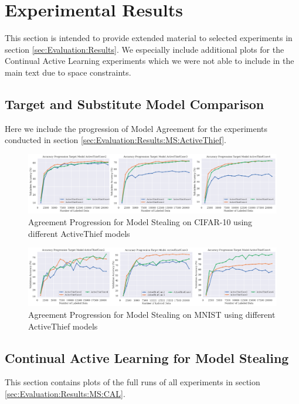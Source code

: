 \section{Experimental Results}
\label{sec:Appendix:Results}
This section is intended to provide extended material to selected experiments in section \ref{sec:Evaluation:Results}. We especially
include additional plots for the Continual Active Learning experiments which we were not able to include in the main text due to
space constraints.

\subsection{Target and Substitute Model Comparison}
\label{sec:Appendix:TargetSubstituteComparison}
Here we include the progression of Model Agreement for the experiments conducted in section \ref{sec:Evaluation:Results:MS:ActiveThief}.

\begin{figure}[!htb]
    \centering
    \includegraphics[width=\linewidth]{images/results_CALMS/cifar10_model_comp.png}
    \caption{Agreement Progression for Model Stealing on CIFAR-10 using different ActiveThief models}
    \label{fig:CIFAR10modelComp}
\end{figure}

\begin{figure}[!htb]
    \centering
    \includegraphics[width=\linewidth]{images/results_CALMS/mnist_model_comp.png}
    \caption{Agreement Progression for Model Stealing on MNIST using different ActiveThief models}
    \label{fig:MNISTmodelComp}
\end{figure}


\subsection{Continual Active Learning for Model Stealing}
\label{sec:Appendix:CALMS}
This section contains plots of the full runs of all experiments in section \ref{sec:Evaluation:Results:MS:CAL}.

